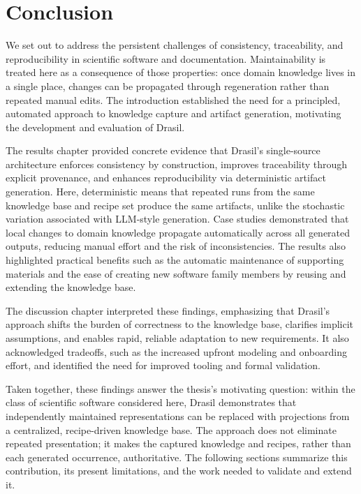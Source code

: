 \chapter{Conclusion}
\label{c:conclusion}

We set out to address the persistent challenges of consistency,
traceability, and reproducibility in scientific software and documentation.
Maintainability is treated here as a consequence of those properties: once
domain knowledge lives in a single place, changes can be propagated through
regeneration rather than repeated manual edits. The introduction established
the need for a principled, automated approach to knowledge capture and
artifact generation, motivating the development and evaluation of Drasil.

The results chapter provided concrete evidence that Drasil's single-source
architecture enforces consistency by construction, improves traceability
through explicit provenance, and enhances reproducibility via deterministic
artifact generation. Here, deterministic means that repeated runs from the
same knowledge base and recipe set produce the same artifacts, unlike the
stochastic variation associated with LLM-style generation. Case studies
demonstrated that local changes to domain knowledge propagate automatically
across all generated outputs, reducing manual effort and the risk of
inconsistencies. The results also highlighted practical benefits such as the
automatic maintenance of supporting materials and the ease of creating new
software family members by reusing and extending the knowledge base.

The discussion chapter interpreted these findings, emphasizing that Drasil's
approach shifts the burden of correctness to the knowledge base, clarifies
implicit assumptions, and enables rapid, reliable adaptation to new
requirements. It also acknowledged tradeoffs, such as the increased upfront
modeling and onboarding effort, and identified the need for improved tooling
and formal validation.

Taken together, these findings answer the thesis's motivating question: within
the class of scientific software considered here, Drasil demonstrates that
independently maintained representations can be replaced with projections from
a centralized, recipe-driven knowledge base. The approach does not eliminate
repeated presentation; it makes the captured knowledge and recipes, rather than
each generated occurrence, authoritative. The following sections summarize
this contribution, its present limitations, and the work needed to validate and
extend it.

